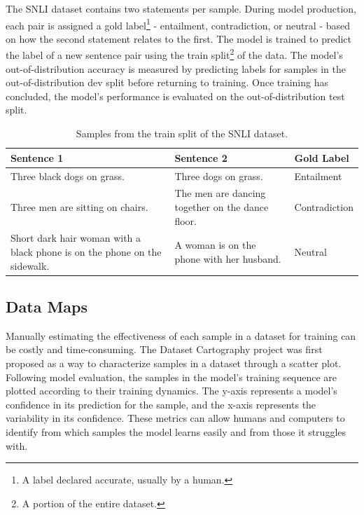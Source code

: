 \documentclass[11pt, a4paper, twocolumn]{article}
\begin{document}
	The SNLI dataset contains two statements per sample. During model production, each pair is assigned a gold label\footnote{A label declared accurate, usually by a human.} - entailment, contradiction, or neutral - based on how the second statement relates to the first. The model is trained to predict the label of a new sentence pair using the train split\footnote{A portion of the entire dataset.} of the data. The model's out-of-distribution accuracy is measured by predicting labels for samples in the out-of-distribution dev split before returning to training. Once training has concluded, the model's performance is evaluated on the out-of-distribution test split.
	
	\begin{table}[!ht]
		\centering
		\begin{tabular}{| m{5.75cm} | m{5.75cm}| m{2.5cm} |}
			\hline
			Sentence 1                                                                & Sentence 2                                       & Gold Label    \\ \hline
			Three black dogs on grass.                                                & Three dogs on grass.                             & Entailment    \\ \hline
			Three men are sitting on chairs.                                          & The men are dancing together on the dance floor. & Contradiction \\ \hline
			Short dark hair woman with a black phone is on the phone on the sidewalk. & A woman is on the phone with her husband.        & Neutral       \\
			\hline 
		\end{tabular}
		\caption{Samples from the train split of the SNLI dataset.}
	\end{table}
	
	\subsection{Data Maps}
	
	Manually estimating the effectiveness of each sample in a dataset for training can be costly and time-consuming. The Dataset Cartography project was first proposed as a way to characterize samples in a dataset through a scatter plot. Following model evaluation, the samples in the model’s training sequence are plotted according to their training dynamics. The y-axis represents a model’s confidence in its prediction for the sample, and the x-axis represents the variability in its confidence. These metrics can allow humans and computers to identify from which samples the model learns easily and from those it struggles with.
	
\end{document}
